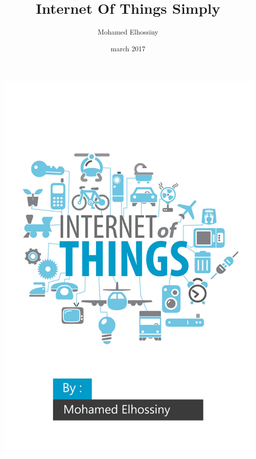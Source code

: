\documentclass[a4paper,12pt]{book}
\begin{document}
\includegraphics[width=\textwidth]{IOTcover}

\author{Mohamed Elhossiny}
\title{Internet Of Things Simply}
\date{march 2017}

\frontmatter
\maketitle
\tableofcontents

\mainmatter






\backmatter


\end{document}
